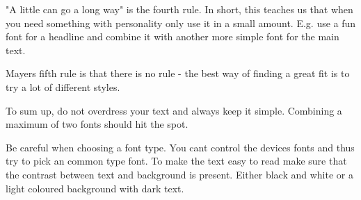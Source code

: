 "A little can go a long way" is the fourth rule. In short, this teaches us that when you need something with personality only use it in a small amount. E.g. use a fun font for a headline and combine it with another more simple font for the main text. 

Mayers fifth rule is that there is no rule - the best way of finding a great fit is to try a lot of different styles. \cite{Font}

To sum up, do not overdress your text and always keep it simple. Combining a maximum of two fonts should hit the spot.\cite{TypeComb}

Be careful when choosing a font type. You cant control the devices fonts and thus try to pick an common type font.  \cite{Graphic} To make the text easy to read make sure that the contrast between text and background is present. Either black and white or a light coloured background with dark text. \cite{Graphic}
